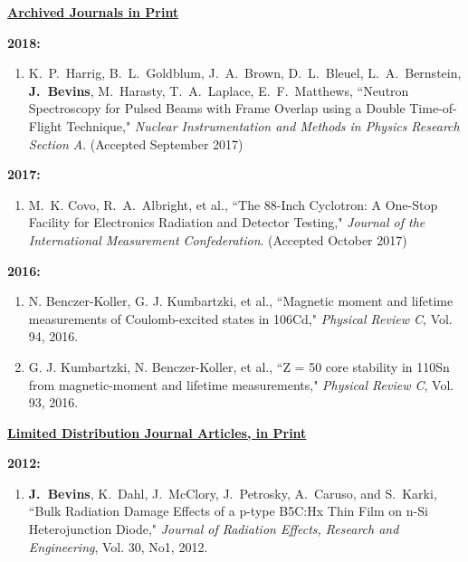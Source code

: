 \underline{\textbf{Archived Journals in Print}}

\textbf{2018:}
\begin{enumerate}
  \item K.\ P.\ Harrig, B.\ L.\ Goldblum, J.\ A.\ Brown, D.\ L.\ Bleuel, L.\ A.\ Bernstein, \textbf{J.\ Bevins}, M.\ Harasty, T.\ A.\ Laplace, E.\ F.\ Matthews, ``Neutron Spectroscopy for Pulsed Beams with Frame Overlap using a Double Time-of-Flight Technique," \textit{Nuclear Instrumentation and Methods in Physics Research Section A}. (Accepted September 2017)
\end{enumerate}

\textbf{2017:}
\begin{enumerate}
\item M.\ K. Covo, R.\ A.\ Albright, et al., ``The 88-Inch Cyclotron: A One-Stop Facility for Electronics Radiation and Detector Testing," \textit{Journal of the International Measurement Confederation}. (Accepted October 2017)
\end{enumerate}

\textbf{2016:}
\begin{enumerate}
  \item N. Benczer-Koller, G. J. Kumbartzki, et al., ``Magnetic moment and lifetime measurements of Coulomb-excited states in 106Cd," \textit{Physical Review C}, Vol. 94, 2016.
  
  \item G. J. Kumbartzki, N. Benczer-Koller, et al., ``Z = 50 core stability in 110Sn from magnetic-moment and lifetime measurements," \textit{Physical Review C}, Vol. 93, 2016.
\end{enumerate}


\underline{\textbf{Limited Distribution Journal Articles, in Print }}

\textbf{2012:}
\begin{enumerate}
  \item \textbf{J.\ Bevins}, K.\ Dahl, J.\ McClory, J.\ Petrosky, A.\ Caruso, and S.\ Karki, ``Bulk Radiation Damage Effects of a p-type B5C:Hx Thin Film on n-Si Heterojunction Diode," \textit{Journal of Radiation Effects, Research and Engineering}, Vol. 30, No1, 2012.
\end{enumerate}


